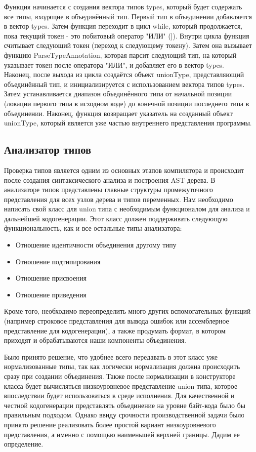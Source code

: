 Функция начинается с создания вектора типов types, который будет содержать все типы, входящие в объединённый тип.
Первый тип в объединении добавляется в вектор types.
Затем функция переходит в цикл while, который продолжается, пока текущий токен - это побитовый оператор "ИЛИ" (|).
Внутри цикла функция считывает следующий токен (переход к следующему токену).
Затем она вызывает функцию ParseTypeAnnotation, которая парсит следующий тип, на который указывает токен после
оператора "ИЛИ", и добавляет его в вектор types.
Наконец, после выхода из цикла создаётся объект unionType, представляющий объединённый тип, и инициализируется с
использованием вектора типов types.
Затем устанавливается диапазон объединённого типа от начальной позиции (локации первого типа в исходном коде)
до конечной позиции последнего типа в объединении.
Наконец, функция возвращает указатель на созданный объект unionType, который является уже частью внутреннего
представления программы.

\subsection{Анализатор типов}

Проверка типов является одним из основных этапов компилятора и происходит после создания синтаксического анализа и
построения AST дерева.
В анализаторе типов представлены главные структуры промежуточного представления для всех узлов дерева и типов
переменных.
Нам необходимо написать свой класс для union типа с необходимым функционалом для анализа и дальнейшей кодогенерации.
Этот класс должен поддерживать следующую функциональность, как и все остальные типы анализатора:

\begin{itemize}[left=2em]
    \item Отношение идентичности объединения другому типу
    \item Отношение подтипирования
    \item Отношение присвоения
    \item Отношение приведения
\end{itemize}

Кроме того, необходимо переопределить много других вспомогательных функций (например строковое представления для
вывода ошибок или ассемблерное представление для кодогенерации), а также продумать формат, в котором приходят и
обрабатываются наши компоненты объединения.

Было принято решение, что удобнее всего передавать в этот класс уже нормализованные типы, так как логически
нормализация должна происходить сразу при создании объединения.
Также после нормализации в конструкторе класса будет вычисляться низкоуровневое представление union типа, которое
впоследствии будет использоваться в среде исполнения.
Для качественной и честной кодогенерации представлять объединение на уровне байт-кода было бы правильным подходом.
Однако ввиду срочности производственной задачи было принято решение реализовать более простой вариант низкоуровневого
представления, а именно с помощью наименьшей верхней границы.
Дадим ее определение.

